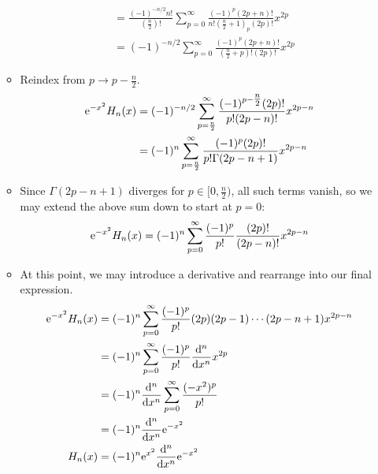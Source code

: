 \documentclass[../finalProject.tex]{subfiles}
\begin{document}
\begin{itemize}
\begin{itemize}
\begin{align*}
            &= \frac{(-1)^{-n/2}n!}{(\tfrac{n}{2})!}\sum_{p=0}^\infty\frac{(-1)^p(2p+n)!}{n!(\tfrac{n}{2}+1)_p(2p)!}x^{2p}\tag*{Identities}\\
            &= (-1)^{-n/2}\sum_{p=0}^\infty\frac{(-1)^p(2p+n)!}{(\tfrac{n}{2}+p)!(2p)!}x^{2p}
        \end{align*}
        \item Reindex from $p\to p-\tfrac{n}{2}$.
        \begin{align*}
            \e[-x^2]H_n(x) &= (-1)^{-n/2}\sum_{p=\frac{n}{2}}^\infty\frac{(-1)^{p-\tfrac{n}{2}}(2p)!}{p!(2p-n)!}x^{2p-n}\\
            &= (-1)^n\sum_{p=\frac{n}{2}}^\infty\frac{(-1)^p(2p)!}{p!\Gamma(2p-n+1)}x^{2p-n}
        \end{align*}
        \item Since $\Gamma(2p-n+1)$ diverges for $p\in[0,\tfrac{n}{2})$, all such terms vanish, so we may extend the above sum down to start at $p=0$:
        \begin{equation*}
            \e[-x^2]H_n(x) = (-1)^n\sum_{p=0}^\infty\frac{(-1)^p}{p!}\frac{(2p)!}{(2p-n)!}x^{2p-n}
        \end{equation*}
        \item At this point, we may introduce a derivative and rearrange into our final expression.
        \begin{align*}
            \e[-x^2]H_n(x) &= (-1)^n\sum_{p=0}^\infty\frac{(-1)^p}{p!}(2p)(2p-1)\cdots(2p-n+1)x^{2p-n}\\
            &= (-1)^n\sum_{p=0}^\infty\frac{(-1)^p}{p!}\dv[n]{x}x^{2p}\\
            &= (-1)^n\dv[n]{x}\sum_{p=0}^\infty\frac{(-x^2)^p}{p!}\\
            &= (-1)^n\dv[n]{x}\e[-x^2]\\
            H_n(x) &= (-1)^n\e[x^2]\dv[n]{x}\e[-x^2]
        \end{align*}
    \end{itemize}
\end{itemize}
\end{document}
